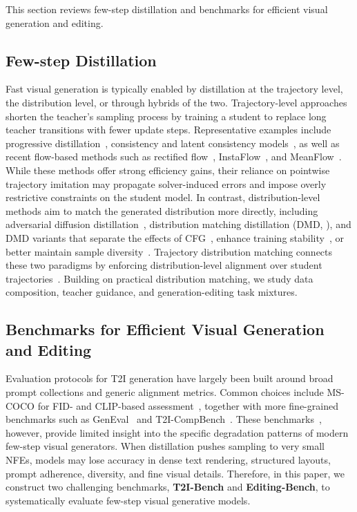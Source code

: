 \documentclass{article}
\begin{document}
This section reviews few-step distillation and benchmarks for efficient visual generation and editing.




\subsection{Few-step Distillation}
Fast visual generation is typically enabled by distillation at the trajectory level, the distribution level, or through hybrids of the two. Trajectory-level approaches shorten the teacher's sampling process by training a student to replace long teacher transitions with fewer update steps. Representative examples include progressive distillation~\citep{salimans2022progressive}, consistency and latent consistency models~\citep{song2023consistency, luo2023latent}, as well as recent flow-based methods such as rectified flow~\citep{liu2023flow}, InstaFlow~\citep{liu2023instaflow}, and MeanFlow~\citep{geng2025mean}. While these methods offer strong efficiency gains, their reliance on pointwise trajectory imitation may propagate solver-induced errors and impose overly restrictive constraints on the student model. In contrast, distribution-level methods aim to match the generated distribution more directly, including adversarial diffusion distillation~\citep{sauer2024adversarial}, distribution matching distillation (DMD, \citealt{yin2024improved,yin2024one}), and DMD variants that separate the effects of CFG~\citep{liu2025decoupled}, enhance training stability~\citep{bai2026optimizing}, or better maintain sample diversity~\citep{wu2026diversity}. Trajectory distribution matching connects these two paradigms by enforcing distribution-level alignment over student trajectories~\citep{luo2026tdm}. Building on practical distribution matching, we study data composition, teacher guidance, and generation-editing task mixtures.




\subsection{Benchmarks for Efficient Visual Generation and Editing}
Evaluation protocols for T2I generation have largely been built around broad prompt collections and generic alignment metrics. Common choices include MS-COCO for FID- and CLIP-based assessment~\citep{lin2014microsoft}, together with more fine-grained benchmarks such as GenEval~\citep{ghosh2023geneval} and T2I-CompBench~\citep{huang2023t2icompbench}. These benchmarks~\citep{ghosh2023geneval, huang2023t2icompbench, lin2014microsoft, wei2025tiif}, however, provide limited insight into the specific degradation patterns of modern few-step visual generators. When distillation pushes sampling to very small NFEs, models may lose accuracy in dense text rendering, structured layouts, prompt adherence, diversity, and fine visual details. Therefore, in this paper, we construct two challenging benchmarks, \textbf{T2I-Bench} and \textbf{Editing-Bench}, to systematically evaluate few-step visual generative models.
\end{document}
